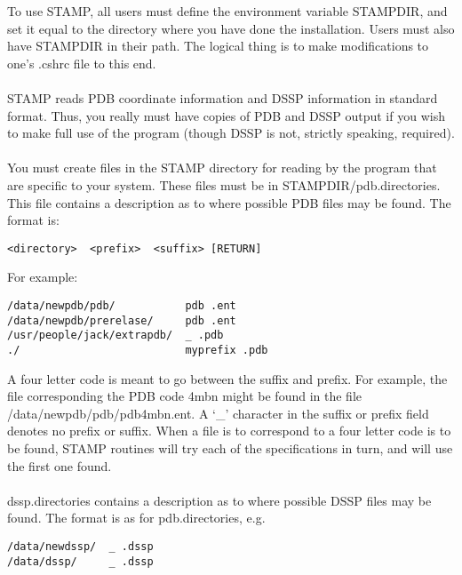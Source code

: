 To use STAMP, all users must define the environment variable
STAMPDIR, and set it equal to the directory where you have done
the installation.  Users must also have STAMPDIR in their path. 
The logical thing is to make modifications to one's .cshrc file to
this end.\\
\\
STAMP reads PDB coordinate information and DSSP information in
standard format.  Thus, you really must have copies of PDB
and DSSP output if you wish to make full use of the program
(though DSSP is not, strictly speaking, required).\\
\\
You must create files in the STAMP directory for reading by the 
program that are specific to your system.  These files must be in
STAMPDIR/pdb.directories.   This file contains a description as to
where possible PDB files may be found.  The format is:\\

\begin{scriptsize}\begin{verbatim}
<directory>  <prefix>  <suffix> [RETURN]
\end{verbatim} \end{scriptsize}

For example:\\

\begin{scriptsize}\begin{verbatim}
/data/newpdb/pdb/           pdb .ent
/data/newpdb/prerelase/     pdb .ent
/usr/people/jack/extrapdb/  _ .pdb
./                          myprefix .pdb
\end{verbatim} \end{scriptsize}

A four letter code is meant to go between the suffix and prefix.
For example, the file corresponding the PDB code 4mbn might be 
found in the file /data/newpdb/pdb/pdb4mbn.ent.  A `\_' character 
in the suffix or prefix field denotes no prefix or suffix.  When 
a file is to correspond to a four letter code is to be found, STAMP
routines will try each of the specifications in turn, and will use
the first one found.  \\
\\
dssp.directories contains a description as to where possible DSSP files
may be found.  The format is as for pdb.directories, e.g.\\

\begin{scriptsize}\begin{verbatim}
/data/newdssp/  _ .dssp
/data/dssp/     _ .dssp
\end{verbatim} \end{scriptsize}

